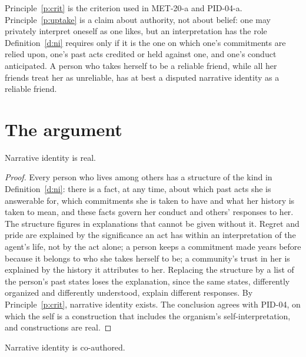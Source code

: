 \documentclass{situationist-preprint}
\begin{document}
Principle~\ref{p:crit} is the criterion used in MET-20-a and PID-04-a. Principle~\ref{p:uptake} is a claim about authority, not about belief: one may privately interpret oneself as one likes, but an interpretation has the role Definition~\ref{d:ni} requires only if it is the one on which one's commitments are relied upon, one's past acts credited or held against one, and one's conduct anticipated. A person who takes herself to be a reliable friend, while all her friends treat her as unreliable, has at best a disputed narrative identity as a reliable friend.

\section{The argument}

\begin{lemma}\label{l:real}
Narrative identity is real.
\end{lemma}

\begin{proof}
Every person who lives among others has a structure of the kind in Definition~\ref{d:ni}: there is a fact, at any time, about which past acts she is answerable for, which commitments she is taken to have and what her history is taken to mean, and these facts govern her conduct and others' responses to her. The structure figures in explanations that cannot be given without it. Regret and pride are explained by the significance an act has within an interpretation of the agent's life, not by the act alone; a person keeps a commitment made years before because it belongs to who she takes herself to be; a community's trust in her is explained by the history it attributes to her. Replacing the structure by a list of the person's past states loses the explanation, since the same states, differently organized and differently understood, explain different responses. By Principle~\ref{p:crit}, narrative identity exists. The conclusion agrees with PID-04, on which the self is a construction that includes the organism's self-interpretation, and constructions are real.
\end{proof}

\begin{lemma}\label{l:co}
Narrative identity is co-authored.
\end{lemma}
\end{document}
